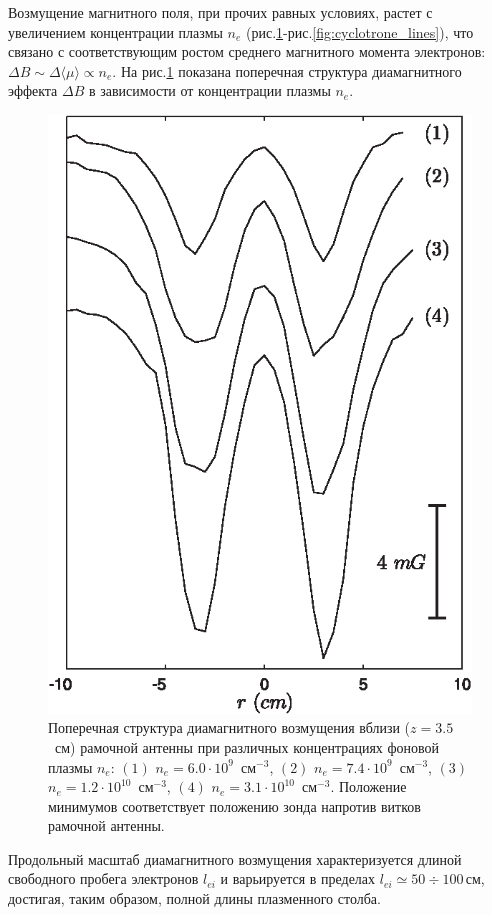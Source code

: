 \documentclass[autoref,10pt]{disser}
\begin{document}
Возмущение магнитного поля, при прочих равных условиях, растет с увеличением концентрации плазмы $n_{e}$ (\mbox{рис.\ref{fig:ne_distr}-рис.\ref{fig:cyclotrone_lines}}), что связано с соответствующим ростом среднего магнитного момента электронов: $\Delta{}B\sim{}\Delta{}\langle{}\mu{}\rangle{}\propto{}n_{e}$.
На \mbox{рис.\ref{fig:ne_distr}} показана поперечная структура диамагнитного эффекта $\Delta{}B$ в зависимости от концентрации плазмы $n_{e}$. 
\begin{figure}[H]
   \centering
   \includegraphics*[width=0.5\columnwidth]{pics/picRaspredelenie.eps}
   \caption{Поперечная структура диамагнитного возмущения вблизи ($z=3.5$~см) рамочной антенны при различных концентрациях фоновой плазмы $n_{e}$: $(1)$ $n_{e}=6.0\cdot{}10^{9}$~см$^{-3}$, $(2)$ $n_{e}=7.4\cdot{}10^{9}$~см$^{-3}$, $(3)$  $n_{e}=1.2\cdot{}10^{10}$~см$^{-3}$, $(4)$ $n_{e}=3.1\cdot{}10^{10}$~см$^{-3}$. Положение минимумов соответствует положению зонда напротив витков рамочной антенны.}
   \label{fig:ne_distr}
\end{figure}

Продольный масштаб диамагнитного возмущения характеризуется длиной свободного пробега электронов $l_{ei}$ и варьируется в пределах $l_{ei}\simeq{}50\div{}100$\,см, достигая, таким образом, полной длины плазменного столба. 

\end{document}
